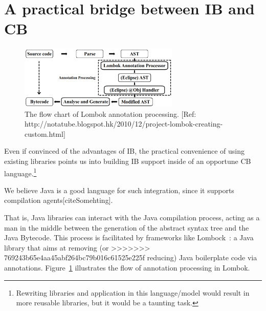 \section{A practical bridge between IB and CB}

\begin{figure}[t]\label{fig:lombok}
\centering
\includegraphics[width=3in]{pdfs/lombok2.png}
\caption{The flow chart of Lombok annotation processing. [Ref: http://notatube.blogspot.hk/2010/12/project-lombok-creating-custom.html]
}
\end{figure}


Even if convinced of the advantages of IB,
the practical convenience
of using existing libraries points us into building IB support
inside of an opportune CB language.\footnote{
Rewriting libraries and application in this language/model
would result in more reusable libraries, but it would be a taunting task.}


We believe Java is a good language for such integration, since it supports compilation agents[citeSomehting].

That is, Java libraries can interact with the Java compilation process,
acting as a man in the middle between the
generation of the abstract syntax tree and the Java Bytecode.
This process is facilitated by frameworks like Lombock~\cite{lombok}:
a Java library that aims at removing (or
>>>>>>> 769243b65e4aa45abf264bc79b016c61525e225f
reducing) Java boilerplate code via
annotations.
Figure~\ref{fig:lombok} illustrates the
flow of \mixin annotation processing in Lombok.

